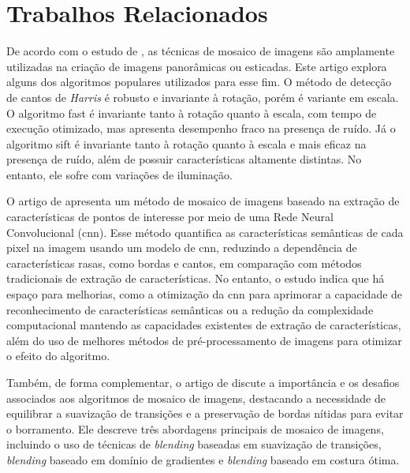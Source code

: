 \section{Trabalhos Relacionados}\label{sec:trabalhosrelacionados}


De acordo com o estudo de , as técnicas de mosaico de imagens são amplamente utilizadas na criação de imagens panorâmicas ou esticadas. Este artigo explora alguns dos algoritmos populares utilizados para esse fim. O método de detecção de cantos de \textit{Harris} é robusto e invariante à rotação, porém é variante em escala. O algoritmo \gls{fast} é invariante tanto à rotação quanto à escala, com tempo de execução otimizado, mas apresenta desempenho fraco na presença de ruído. Já o algoritmo \gls{sift} é invariante tanto à rotação quanto à escala e mais eficaz na presença de ruído, além de possuir características altamente distintas. No entanto, ele sofre com variações de iluminação.

O artigo de  apresenta um método de mosaico de imagens baseado na extração de características de pontos de interesse por meio de uma Rede Neural Convolucional (\gls{cnn}). Esse método quantifica as características semânticas de cada pixel na imagem usando um modelo de \gls{cnn}, reduzindo a dependência de características rasas, como bordas e cantos, em comparação com métodos tradicionais de extração de características. No entanto, o estudo indica que há espaço para melhorias, como a otimização da \gls{cnn} para aprimorar a capacidade de reconhecimento de características semânticas ou a redução da complexidade computacional mantendo as capacidades existentes de extração de características, além do uso de melhores métodos de pré-processamento de imagens para otimizar o efeito do algoritmo.

Também, de forma complementar, o artigo de  discute a importância e os desafios associados aos algoritmos de mosaico de imagens, destacando a necessidade de equilibrar a suavização de transições e a preservação de bordas nítidas para evitar o borramento. Ele descreve três abordagens principais de mosaico de imagens, incluindo o uso de técnicas de \textit{blending} baseadas em suavização de transições, \textit{blending} baseado em domínio de gradientes e \textit{blending} baseado em costura ótima.

